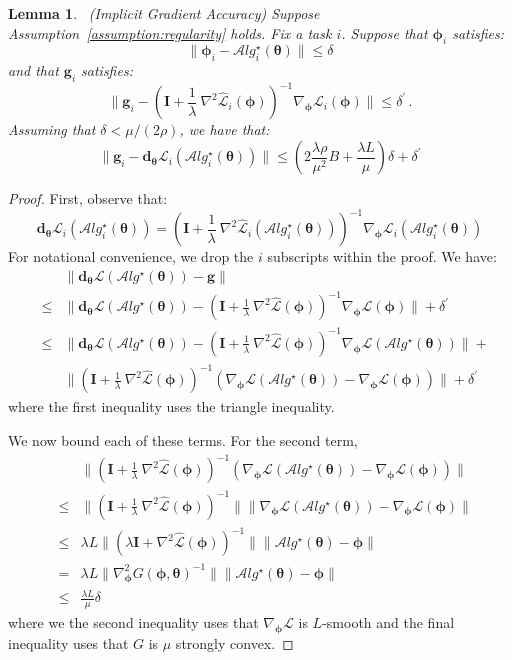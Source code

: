 \documentclass{article} \usepackage[nonatbib, final]{mod_neurips}
\newcommand{\eye}{\boldsymbol{I}}
\newtheorem{lemma}{Lemma}
\newcommand{\param}{{\bm{\phi}}}               \newcommand{\paramspace}{\Phi}
\newcommand{\prior}{{\bm{\theta}}}               \newcommand{\priorspace}{\Theta}
\newcommand{\fn}{\mathcal{L}}                  \newcommand{\udfn}{\tilde{\fn}}        \newcommand{\fnht}{\hat{\fn}}        \newcommand{\ud}{\alg}
\newcommand{\algstar}{\mathcal{A}lg^\star}
\newcommand{\grad}{\bm{d}}
\newcommand{\pgrad}{\nabla}
\begin{document}
\begin{lemma}~\label{lemma:perturbation}
(Implicit Gradient Accuracy) Suppose
Assumption~\ref{assumption:regularity} holds. Fix a task $i$.
Suppose that $\param_i$ satisfies:
\[
  \|\param_i-\algstar_i(\prior)\|\leq \delta
\]
and that $\bm{g}_i$ satisfies:
  \[
    \|\bm{g}_i- \left( \eye + \frac{1}{\lambda}~ \pgrad^2 \fnht_i (\param) \right)^{-1}\pgrad_\param \fn_i(\param)\|
\leq \delta^\prime \, .
\]
Assuming that $\delta<\mu/(2\rho)$, we have that:
\[
\|\bm{g}_i - \grad_\prior \fn_i(\algstar_i(\prior)) \| \leq 
\left(2 \frac{\lambda\rho}{\mu^2} B
                + \frac{\lambda L}{\mu}\right)\delta+ \delta^\prime
\]
\end{lemma}

\begin{proof}
  First, observe that:
  \[
\grad_\prior \fn_i(\algstar_i(\prior)) =
\left( \eye + \frac{1}{\lambda}~ \pgrad^2 \fnht_i (\algstar_i(\prior)) \right)^{-1}\pgrad_\param \fn_i(\algstar_i(\prior))
    \]
For notational convenience,  we drop the $i$ subscripts within the
proof. We have:
\begin{eqnarray*}
&&
\|\grad_\prior \fn(\algstar(\prior))-\bm{g}\| \\
&\leq &
\|\grad_\prior \fn(\algstar(\prior))-\left( \eye + \frac{1}{\lambda}~ \pgrad^2 \fnht (\param) \right)^{-1}\pgrad_\param \fn(\param)  \|+ \delta^\prime\\
&\leq &
\|\grad_\prior \fn(\algstar(\prior))-\left( \eye + \frac{1}{\lambda}~ \pgrad^2 \fnht (\param) \right)^{-1}\pgrad_\param \fn(\algstar(\prior))  \|
                +\\
&&\|\left( \eye + \frac{1}{\lambda}~ \pgrad^2 \fnht (\param) \right)^{-1}
\left(\pgrad_\param \fn(\algstar(\prior))  -\pgrad_\param \fn(\param)\right)\|
 + \delta^\prime
\end{eqnarray*}
where the first inequality uses the triangle inequality.

We now bound each of these terms. For the second term,
\begin{eqnarray*}
&&\|\left( \eye + \frac{1}{\lambda}~ \pgrad^2 \fnht (\param) \right)^{-1}
\left(\pgrad_\param \fn(\algstar(\prior))  -\pgrad_\param \fn(\param)\right)\|
\\
&\leq &
\|\left( \eye + \frac{1}{\lambda}~ \pgrad^2 \fnht (\param) \right)^{-1}\|
\|\pgrad_\param \fn(\algstar(\prior))  -\pgrad_\param \fn(\param)\| \\
&\leq &
\lambda L \|\left( \lambda \eye + \pgrad^2 \fnht (\param) \right)^{-1}\|
\|\algstar(\prior)  - \param\| \\
&= &
\lambda L \| \nabla^2_\param G(\param,\prior)^{-1}\|
\|\algstar(\prior)  - \param\| \\
&\leq & \frac{\lambda L}{\mu}\delta
\end{eqnarray*}
where we the second inequality uses that  $\pgrad_\param \fn$ is
$L$-smooth and the final inequality uses that $G$ is $\mu$ strongly convex.



\end{proof}
\end{document}
